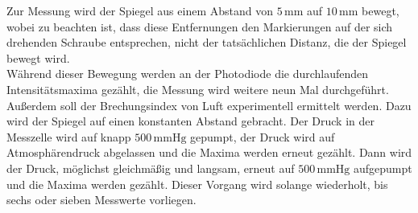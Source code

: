 Zur Messung wird der Spiegel aus einem Abstand von $5 \,\si{\milli\meter}$ auf $10 \,\si{\milli\meter}$ bewegt, wobei zu beachten ist, 
dass diese Entfernungen den Markierungen auf der sich drehenden Schraube entsprechen, nicht der tatsächlichen Distanz, die der Spiegel bewegt wird. \\

Während dieser Bewegung werden an der Photodiode die durchlaufenden Intensitätsmaxima gezählt, die Messung wird weitere neun Mal durchgeführt. \\

Außerdem soll der Brechungsindex von Luft experimentell ermittelt werden.
Dazu wird der Spiegel auf einen konstanten Abstand gebracht.
Der Druck in der Messzelle wird auf knapp $500 \, \si{\milli\meter}\text{Hg}$ gepumpt, der Druck wird auf Atmosphärendruck abgelassen und die Maxima werden erneut gezählt.
Dann wird der Druck, möglichst gleichmäßig und langsam, erneut auf $500 \, \si{\milli\meter}\text{Hg}$ aufgepumpt und die Maxima werden gezählt.
Dieser Vorgang wird solange wiederholt, bis sechs oder sieben Messwerte vorliegen.




